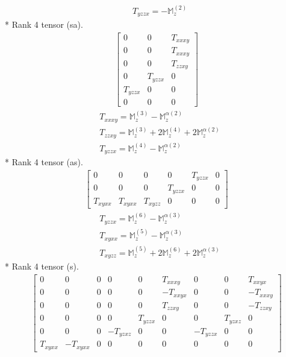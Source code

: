 \documentclass[fleqn,8pt,landscape]{jsarticle}
\begin{document}
\begin{align*}
& T_{yzzx} = - \mathbb{M}_{z}^{(2)}
\end{align*}
* Rank 4 tensor (sa).
\begin{align*}
\begin{bmatrix} 0 & 0 & T_{xxxy} \\ 0 & 0 & T_{xxxy} \\ 0 & 0 & T_{zzxy} \\ 0 & T_{yzzx} & 0 \\ T_{yzzx} & 0 & 0 \\ 0 & 0 & 0 \end{bmatrix}
\end{align*}
\begin{align*}
& T_{xxxy} = \mathbb{M}_{z}^{(3)} - \mathbb{M}_{z}^{\alpha(2)} \\
& T_{zzxy} = \mathbb{M}_{z}^{(3)} + 2 \mathbb{M}_{z}^{(4)} + 2 \mathbb{M}_{z}^{\alpha(2)} \\
& T_{yzzx} = \mathbb{M}_{z}^{(4)} - \mathbb{M}_{z}^{\alpha(2)}
\end{align*}
* Rank 4 tensor (as).
\begin{align*}
\begin{bmatrix} 0 & 0 & 0 & 0 & T_{yzzx} & 0 \\ 0 & 0 & 0 & T_{yzzx} & 0 & 0 \\ T_{xyxx} & T_{xyxx} & T_{xyzz} & 0 & 0 & 0 \end{bmatrix}
\end{align*}
\begin{align*}
& T_{yzzx} = \mathbb{M}_{z}^{(6)} - \mathbb{M}_{z}^{\alpha(3)} \\
& T_{xyxx} = \mathbb{M}_{z}^{(5)} - \mathbb{M}_{z}^{\alpha(3)} \\
& T_{xyzz} = \mathbb{M}_{z}^{(5)} + 2 \mathbb{M}_{z}^{(6)} + 2 \mathbb{M}_{z}^{\alpha(3)}
\end{align*}
* Rank 4 tensor (s).
\begin{align*}
\begin{bmatrix} 0 & 0 & 0 & 0 & 0 & T_{xxxy} & 0 & 0 & T_{xxyx} \\ 0 & 0 & 0 & 0 & 0 & - T_{xxyx} & 0 & 0 & - T_{xxxy} \\ 0 & 0 & 0 & 0 & 0 & T_{zzxy} & 0 & 0 & - T_{zzxy} \\ 0 & 0 & 0 & 0 & T_{yzzx} & 0 & 0 & T_{yzxz} & 0 \\ 0 & 0 & 0 & - T_{yzxz} & 0 & 0 & - T_{yzzx} & 0 & 0 \\ T_{xyxx} & - T_{xyxx} & 0 & 0 & 0 & 0 & 0 & 0 & 0 \end{bmatrix}
\end{align*}
\end{document}
